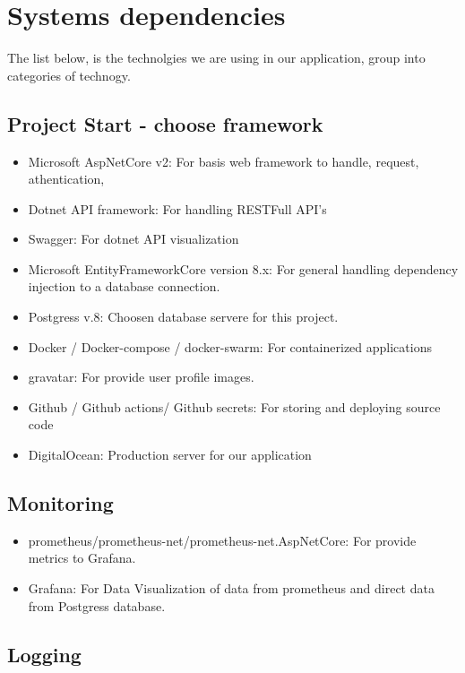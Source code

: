 
\section{Systems dependencies}

The list below, is the technolgies we are using in our application, group into categories of technogy. 

\subsection*{Project Start - choose framework}

\begin{itemize}
    \item Microsoft AspNetCore v2: For basis web framework to handle, request, athentication, 
    \item Dotnet API framework: For handling RESTFull API's 
    \item Swagger: For dotnet API visualization
    \item Microsoft EntityFrameworkCore version 8.x: For general handling dependency injection to a database connection. 
    \item Postgress v.8: Choosen database servere for this project. 
    \item Docker / Docker-compose / docker-swarm: For containerized applications 
    \item gravatar: For provide user profile images. 
    \item Github / Github actions/ Github secrets: For storing and deploying source code
    \item DigitalOcean: Production server for our application 
\end{itemize}


\subsection*{Monitoring}

\begin{itemize}
    \item prometheus/prometheus-net/prometheus-net.AspNetCore: For provide metrics to Grafana. 
    \item Grafana: For Data Visualization of data from prometheus and direct data from Postgress database. 
\end{itemize}

\subsection*{Logging}

